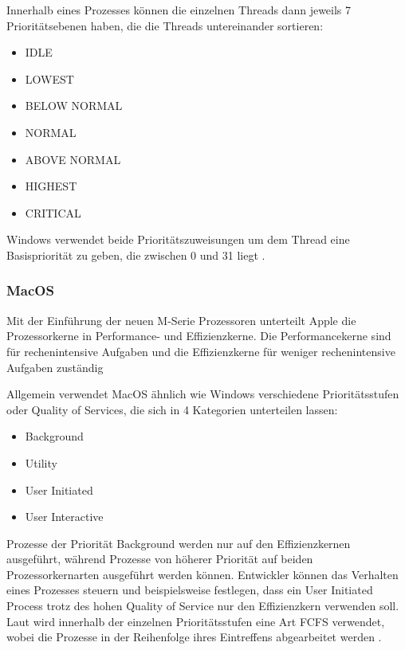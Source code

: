 Innerhalb eines Prozesses können die einzelnen Threads dann jeweils 7 Prioritätsebenen haben, die die Threads untereinander sortieren:
\begin{multicols}{3}
    \begin{itemize}[noitemsep]
        \item IDLE
        \item LOWEST
        \item BELOW NORMAL
        \item NORMAL
        \item ABOVE NORMAL
        \item HIGHEST
        \item CRITICAL
    \end{itemize}
\end{multicols}

Windows verwendet beide Prioritätszuweisungen um dem Thread eine Basispriorität zu geben, die zwischen 0 und 31 liegt \autocite{KarlBridgeMicrosoft.2023}.

\subsubsection{MacOS}
Mit der Einführung der neuen M-Serie Prozessoren unterteilt Apple die Prozessorkerne in Performance- und Effizienzkerne. Die Performancekerne sind für rechenintensive Aufgaben und die Effizienzkerne für weniger rechenintensive Aufgaben zuständig \autocite{hoakley.2022}

Allgemein verwendet MacOS ähnlich wie Windows verschiedene Prioritätsstufen oder Quality of Services, die sich in 4 Kategorien unterteilen lassen:
\begin{multicols}{2}
    \begin{itemize}[noitemsep]
        \item Background
        \item Utility
        \item User Initiated
        \item User Interactive
    \end{itemize}
\end{multicols}
Prozesse der Priorität Background werden nur auf den Effizienzkernen ausgeführt, während Prozesse von höherer Priorität auf beiden Prozessorkernarten ausgeführt werden können.
Entwickler können das Verhalten eines Prozesses steuern und beispielsweise festlegen, dass ein User Initiated Process trotz des hohen Quality of Service nur den Effizienzkern verwenden soll.
Laut  wird innerhalb der einzelnen Prioritätsstufen eine Art \ac{FCFS} verwendet, wobei die Prozesse in der Reihenfolge ihres Eintreffens abgearbeitet werden \autocite{hoakley.2022b}. 

